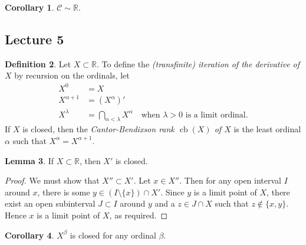 \documentclass[10pt,letterpaper,cm]{nupset}
\theoremstyle{definition}
\newtheorem{definition}{Definition}[subsection]
\theoremstyle{theorem}
\newtheorem{lemma}[definition]{Lemma}
\newtheorem{corollary}[definition]{Corollary}
\theoremstyle{remark}
\newcommand{\R}{\mathbb R}
\newcommand{\1}{\mathbf{1}}
\newcommand{\0}{\vec 0}
\DeclareMathOperator{\cb}{cb}
\begin{document}
\begin{corollary}
$\bm{\mathcal{C}} \sim \R$.
\end{corollary}

\subsection{Lecture 5}

\begin{definition}
Let $X\subset \R$. To define the \textit{(transfinite) iteration of the derivative of $X$} by recursion on the ordinals, let
\begin{align*}
X^0 & = X
\\ X^{\alpha +1} & =  \left(X^{\alpha}\right)'
\\ X^{\lambda} & = \bigcap_{\alpha < \lambda} X^{\alpha} \quad \text{when } \lambda >0 \text{ is a limit ordinal}.
\end{align*} 
If $X$ is closed, then the \textit{Cantor-Bendixson rank $\cb(X)$ of $X$} is the least ordinal $\alpha$ such that $X^{\alpha} = X^{\alpha +1}$.
\end{definition}

\begin{lemma}\label{closed}
If $X\subset \R$, then $X'$ is closed. 
\end{lemma}
\begin{proof}
We must show that $X'' \subset X'$. Let $x\in X''$. Then for any open interval $I$ around $x$, there is some $y \in \left(I \setminus \{x\}\right) \cap X'$. Since $y$ is a limit point of $X$, there exist an open subinterval $J \subset I$ around $y$ and a $z \in J \cap X$  such that $z\notin \{x,y\}$. Hence $x$ is a limit point of $X$, as required. 
\end{proof}

\begin{corollary}
$X^{\beta}$ is closed for any ordinal $\beta$.
\end{corollary}
\end{document}

